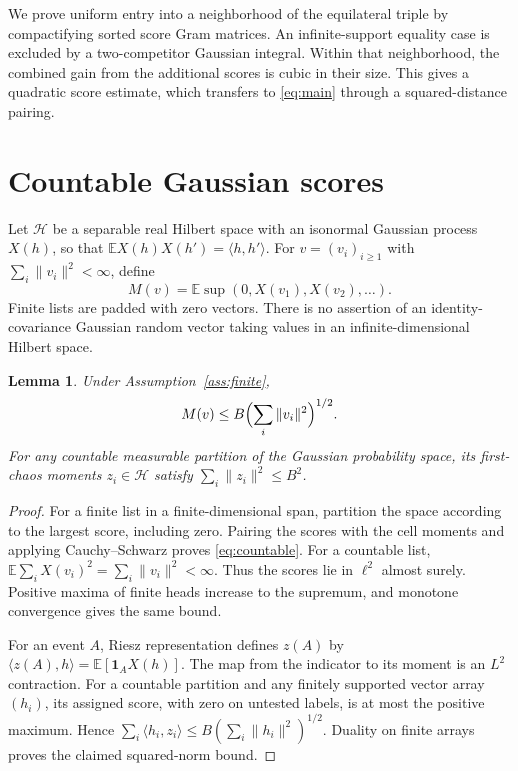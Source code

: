 \documentclass[11pt,reqno]{amsart}
\numberwithin{equation}{section}
\newtheorem{lemma}[theorem]{Lemma}
\theoremstyle{definition}
\theoremstyle{remark}
\newcommand{\E}{\mathbb E}
\begin{document}
We prove uniform entry into a neighborhood of the equilateral triple
by compactifying sorted score Gram matrices. An infinite-support
equality case is excluded by a two-competitor Gaussian integral.
Within that neighborhood, the combined gain from the additional
scores is cubic in their size. This gives a quadratic score estimate,
which transfers to \eqref{eq:main} through a squared-distance pairing.

\section{Countable Gaussian scores}
Let $\mathcal H$ be a separable real Hilbert space with an isonormal
Gaussian process $X(h)$, so that $\E X(h)X(h')=\langle h,h'\rangle$.
For $v=(v_i)_{i\ge1}$ with $\sum_i\|v_i\|^2<\infty$, define
\[
 M(v)=\E\sup(0,X(v_1),X(v_2),\ldots).
\]
Finite lists are padded with zero vectors. There is no assertion of
an identity-covariance Gaussian random vector taking values in an
infinite-dimensional Hilbert space.

\begin{lemma}\label{lem:countable}
Under Assumption~\ref{ass:finite},
\begin{equation}\label{eq:countable}
                      M(v)\le B\Bigl(\sum_i\|v_i\|^2\Bigr)^{1/2}.
\end{equation}
For any countable measurable partition of the Gaussian probability
space, its first-chaos moments $z_i\in\mathcal H$ satisfy
$\sum_i\|z_i\|^2\le B^2$.
\end{lemma}
\begin{proof}
For a finite list in a finite-dimensional span, partition the space
according to the largest score, including zero. Pairing the scores
with the cell moments and applying Cauchy--Schwarz proves
\eqref{eq:countable}. For a countable list,
$\E\sum_i X(v_i)^2=\sum_i\|v_i\|^2<\infty$.
Thus the scores lie in $\ell^2$ almost surely. Positive maxima of
finite heads increase to the supremum, and monotone convergence gives
the same bound.

For an event $A$, Riesz representation defines $z(A)$ by
$\langle z(A),h\rangle=\E[\mathbf1_A X(h)]$.
The map from the indicator to its moment is an $L^2$ contraction.
For a countable partition and any finitely supported vector array
$(h_i)$, its assigned score, with zero on untested labels, is at most
the positive maximum. Hence
$\sum_i\langle h_i,z_i\rangle\le B(\sum_i\|h_i\|^2)^{1/2}$.
Duality on finite arrays proves the claimed squared-norm bound.
\end{proof}
\end{document}
